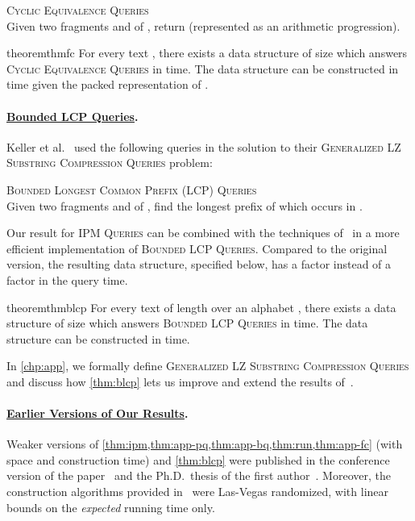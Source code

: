 \documentclass[a4paper]{article}
\theoremstyle{definition}
\theoremstyle{remark}
\newcommand{\IPM}{\textsc{IPM Queries}\xspace}
\newcommand{\FC}{\textsc{Cyclic Equivalence Queries}\xspace}
\newcommand{\BLCPFull}{\textsc{Bounded Longest Common Prefix (LCP) Queries}\xspace}
\newcommand{\BLCP}{\textsc{Bounded LCP Queries}\xspace}
\newcommand{\GSC}{\textsc{Generalized LZ Substring Compression Queries}\xspace}
\newenvironment{dsproblem}[1]
{\begin{center}\begin{lrbox}{\mybox}\begin{minipage}{0.96\columnwidth}{\textsc{#1}}\\}
{\end{minipage}\end{lrbox}\fbox{\usebox{\mybox}}\end{center}}
\newcommand{\defdsproblem}[2]{
  \begin{dsproblem}{#1}
#2
  \end{dsproblem}
  }
\begin{document}
\defdsproblem{\FC}{
Given two fragments  and  of , return  (represented as an arithmetic progression).
}

\begin{restatable}{theorem}{thmfc}\label{thm:app-fc}
  For every text , there exists a data structure of size  which answers \FC in  time. The data structure can be constructed in  time given the packed representation of .
\end{restatable}

\paragraph{\underline{Bounded LCP Queries}.}
Keller et al.~\cite{DBLP:journals/tcs/KellerKFL14} used the following queries in the solution to their \GSC problem:
\defdsproblem{\BLCPFull}{Given two fragments  and  of , find the longest prefix  of  which  occurs in .}

Our result for \IPM can be combined with the techniques of~\cite{DBLP:journals/tcs/KellerKFL14} in a more efficient implementation of \BLCP.
Compared to the original version, the resulting data structure,
specified below, has a  factor instead of a  factor in the query time.

\begin{restatable}{theorem}{thmblcp}\label{thm:blcp}
For every text  of length  over an alphabet , there exists a data structure of size 
which answers \BLCP in  time.
The data structure can be constructed in  time.
\end{restatable}

In \cref{chp:app}, we formally define \GSC and discuss how \cref{thm:blcp} lets us improve and extend the results of~\cite{DBLP:journals/tcs/KellerKFL14}.

\paragraph{\underline{Earlier Versions of Our Results}.}
Weaker versions of \cref{thm:ipm,thm:app-pq,thm:app-bq,thm:run,thm:app-fc} (with  space and construction time) and \cref{thm:blcp} were published in the conference version of the paper~\cite{DBLP:conf/soda/KociumakaRRW15} and the Ph.D.\ thesis of the first author~\cite{phd}. Moreover, the construction algorithms provided in~\cite{DBLP:conf/soda/KociumakaRRW15} were Las-Vegas randomized, with linear bounds on the \emph{expected} running time only.
\end{document}
